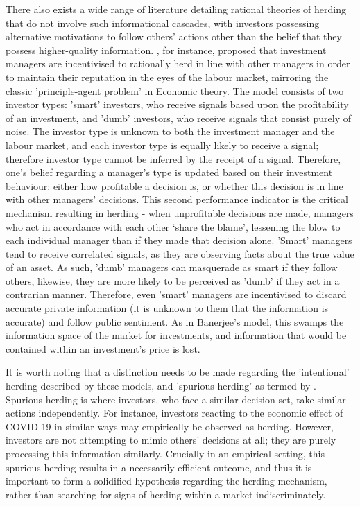 \documentclass[12pt]{article}
\numberwithin{table}{section}   %
\begin{document}
There also exists a wide range of literature detailing rational theories of herding that do not involve such informational cascades, with investors possessing alternative motivations to follow others' actions other than the belief that they possess higher-quality information. \cite{scharfstein}, for instance, proposed that investment managers are incentivised to rationally herd in line with other managers in order to maintain their reputation in the eyes of the labour market, mirroring the classic 'principle-agent problem' in Economic theory. The model consists of two investor types: 'smart' investors, who receive signals based upon the profitability of an investment, and 'dumb' investors, who receive signals that consist purely of noise. The investor type is unknown to both the investment manager and the labour market, and each investor type is equally likely to receive a signal; therefore investor type cannot be inferred by the receipt of a signal. Therefore, one's belief regarding a manager's type is updated based on their investment behaviour: either how profitable a decision is, or whether this decision is in line with other managers' decisions. This second performance indicator is the critical mechanism resulting in herding - when unprofitable decisions are made, managers who act in accordance with each other ‘share the blame’, lessening the blow to each individual manager than if they made that decision alone. 'Smart' managers tend to receive correlated signals, as they are observing facts about the true value of an asset. As such, 'dumb' managers can masquerade as smart if they follow others, likewise, they are more likely to be perceived as 'dumb' if they act in a contrarian manner. Therefore, even 'smart' managers are incentivised to discard accurate private information (it is unknown to them that the information is accurate) and follow public sentiment. As in Banerjee's model, this swamps the information space of the market for investments, and information that would be contained within an investment's price is lost.

It is worth noting that a distinction needs to be made regarding the 'intentional' herding described by these models, and 'spurious herding' as termed by \cite{bikh-review}. Spurious herding is where investors, who face a similar decision-set, take similar actions independently. For instance, investors reacting to the economic effect of COVID-19 in similar ways may empirically be observed as herding. However, investors are not attempting to mimic others' decisions at all; they are purely processing this information similarly. Crucially in an empirical setting, this spurious herding results in a necessarily efficient outcome, and thus it is important to form a solidified hypothesis regarding the herding mechanism, rather than searching for signs of herding within a market indiscriminately.
\end{document}
